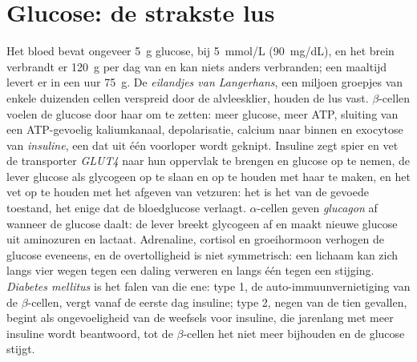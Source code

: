 \section{Glucose: de strakste lus}

\begin{definition}\label{def:b3:endocrinology:glucose}
Het bloed bevat ongeveer \qty{5}{g} glucose, bij \qty{5}{mmol/L}
(\qty{90}{mg/dL}), en het brein verbrandt er \qty{120}{g} per dag van
en kan niets anders verbranden; een maaltijd levert er in een uur
\qty{75}{g}. De \emph{eilandjes van Langerhans}, een miljoen groepjes
van enkele duizenden cellen verspreid door de alvleesklier, houden de
lus vast. $\beta$-cellen voelen de glucose door haar om te zetten: meer
glucose, meer ATP, sluiting van een ATP-gevoelig kaliumkanaal,
depolarisatie, calcium naar binnen en exocytose van \emph{insuline},
een  dat uit één voorloper wordt geknipt. Insuline zegt
spier en vet de transporter \emph{GLUT4} naar hun oppervlak te brengen
en glucose op te nemen, de lever glucose als glycogeen op te slaan en
op te houden met haar te maken, en het vet op te houden met het afgeven
van vetzuren: het is het  van de gevoede toestand, het enige dat
de bloedglucose verlaagt. $\alpha$-cellen geven \emph{glucagon} af
wanneer de glucose daalt: de lever breekt glycogeen af en maakt nieuwe
glucose uit aminozuren en lactaat. Adrenaline, cortisol en groeihormoon
verhogen de glucose eveneens, en de overtolligheid is niet symmetrisch:
een lichaam kan zich langs vier wegen tegen een daling verweren en
langs één tegen een stijging. \emph{Diabetes mellitus} is het falen van
die ene: type 1, de auto-immuunvernietiging van de $\beta$-cellen,
vergt vanaf de eerste dag insuline; type 2, negen van de tien gevallen,
begint als ongevoeligheid van de weefsels voor insuline, die jarenlang
met meer insuline wordt beantwoord, tot de $\beta$-cellen het niet meer
bijhouden en de glucose stijgt.
\end{definition}

